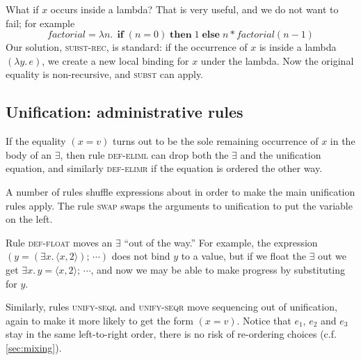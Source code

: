 \documentclass[acmsmall,review,dvipsnames]{acmart}
\newcommand{\Varid}[1]{\mathit{#1}}
\newcommand{\rulename}[1]{\textsc{\small #1}}
\begin{document}
What if \ensuremath{\Varid{x}} occurs inside a lambda?  That is very useful, and we do not want to fail; for example
$$
\ensuremath{\Varid{factorial}\mathrel{=}\lambda\Varid{n}.\,\;\textbf{if}\;(\Varid{n}\mathrel{=}\mathrm{0})\;\textbf{then}\;\mathrm{1}\;\textbf{else}\;\Varid{n}\mathbin{*}\Varid{factorial}(\Varid{n}\mathbin{-}\mathrm{1})}
$$
Our solution, \rulename{subst-rec}, is standard: if the occurrence of \ensuremath{\Varid{x}} is inside a lambda \ensuremath{(\lambda\Varid{y}.\,\Varid{e})},
we create a new local binding for \ensuremath{\Varid{x}} under the lambda.  Now the original equality is
non-recursive, and \rulename{subst} can apply.


\subsection{Unification: administrative rules}


If the equality \ensuremath{(\Varid{x}\mathrel{=}\Varid{v})} turns out to be the sole remaining occurrence of \ensuremath{\Varid{x}} in
the body of an \ensuremath{\exists}, then rule \rulename{def-eliml} can drop both the \ensuremath{\exists}
and the unification equation, and similarly \rulename{def-elimr} if the equation is ordered the other way.


A number of rules shuffle expressions about in order to make
the main unification rules apply.
The rule \rulename{swap} swaps the arguments to unification to put the variable on the left.

Rule \rulename{def-float} moves an \ensuremath{\exists} ``out of the way.'' For example,
the expression \ensuremath{(\Varid{y}\mathrel{=}(\exists\Varid{x}.\,\langle{}\Varid{x},\mathrm{2}\rangle);\,\cdots)} does not bind \ensuremath{\Varid{y}} to a value, but if we float the \ensuremath{\exists} out
we get \ensuremath{\exists\Varid{x}.\,\Varid{y}\mathrel{=}\langle{}\Varid{x},\mathrm{2}\rangle;\,\cdots}, and now we may be able to make progress by substituting for \ensuremath{\Varid{y}}.

Similarly, rules \rulename{unify-seql} and \rulename{unify-seqr} move sequencing out of unification,
again to make it more likely to get the form \ensuremath{(\Varid{x}\mathrel{=}\Varid{v})}.  Notice that \ensuremath{\Varid{e}_{\mathrm{1}}}, \ensuremath{\Varid{e}_{\mathrm{2}}} and \ensuremath{\Varid{e}_{\mathrm{3}}} stay in the
same left-to-right order, there is no risk of re-ordering choices (c.f. \cref{sec:mixing}).
\end{document}
